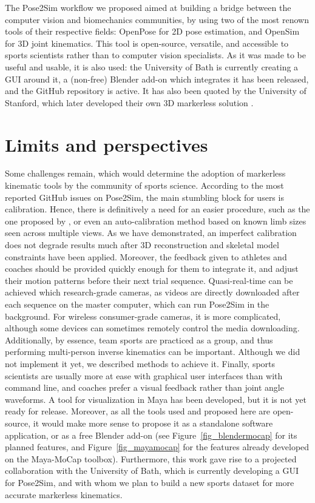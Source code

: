 The Pose2Sim workflow we proposed aimed at building a bridge between the computer vision and biomechanics communities, by using two of the most renown tools of their respective fields: OpenPose for 2D pose estimation, and OpenSim for 3D joint kinematics. This tool is open-source, versatile, and accessible to sports scientists rather than to computer vision specialists. As it was made to be useful and usable, it is also used: the University of Bath is currently creating a GUI around it, a (non-free) Blender add-on which integrates it has been released, and the GitHub repository is active. It has also been quoted by the University of Stanford, which later developed their own 3D markerless solution \cite{Uhlrich2022}. 


\section*{Limits and perspectives}
Some challenges remain, which would determine the adoption of markerless kinematic tools by the community of sports science. According to the most reported GitHub issues on Pose2Sim, the main stumbling block for users is calibration. Hence, there is definitively a need for an easier procedure, such as the one proposed by \cite{Argus}, or even an auto-calibration method based on known limb sizes seen across multiple views. As we have demonstrated, an imperfect calibration does not degrade results much after 3D reconstruction and skeletal model constraints have been applied. Moreover, the feedback given to athletes and coaches should be provided quickly enough for them to integrate it, and adjust their motion patterns before their next trial sequence. Quasi-real-time can be achieved which research-grade cameras, as videos are directly downloaded after each sequence on the master computer, which can run Pose2Sim in the background. For wireless consumer-grade cameras, it is more complicated, although some devices can sometimes remotely control the media downloading. Additionally, by essence, team sports are practiced as a group, and thus performing multi-person inverse kinematics can be important. Although we did not implement it yet, we described methods to achieve it. Finally, sports scientists are usually more at ease with graphical user interfaces than with command line, and coaches prefer a visual feedback rather than joint angle waveforms. A tool for visualization in Maya has been developed, but it is not yet ready for release. Moreover, as all the tools used and proposed here are open-source, it would make more sense to propose it as a standalone software application, or as a free Blender add-on (see Figure~\ref{fig_blendermocap} for its planned features, and Figure~\ref{fig_mayamocap} for the features already developed on the Maya-MoCap toolbox). Furthermore, this work gave rise to a projected collaboration with the University of Bath, which is currently developing a GUI for Pose2Sim, and with whom we plan to build a new sports dataset for more accurate markerless kinematics. 

